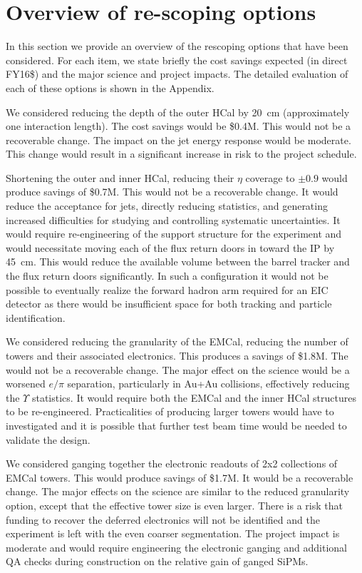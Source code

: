 
\section{Overview of re-scoping options}
\label{sec:overview-re-scoping}

In this section we provide an overview of the rescoping options that
have been considered.  For each item, we state briefly the cost
savings expected (in direct FY16\$) and the major science and project
impacts.  The detailed evaluation of each of these options is shown in
the Appendix.

We considered reducing the depth of the outer HCal by 20~cm
(approximately one interaction length).  The cost savings would be
\$0.4M.  This would not be a recoverable change. The impact on the jet
energy response would be moderate.  This change would result in a
significant increase in risk to the project schedule.

Shortening the outer and inner HCal, reducing their $\eta$ coverage to
$\pm0.9$ would produce savings of \$0.7M.  This would not be a
recoverable change.  It would reduce the acceptance for jets, directly
reducing statistics, and generating increased difficulties for
studying and controlling systematic uncertainties.  It would require
re-engineering of the support structure for the experiment and would
necessitate moving each of the flux return doors in toward the IP by
45~cm.  This would reduce the available volume between the barrel tracker 
and the flux return doors significantly. In such a configuration it 
would not be possible to eventually realize the forward hadron arm 
required for an EIC detector as there would be insufficient space for 
both tracking and particle identification.

We considered reducing the granularity of the EMCal, reducing the
number of towers and their associated electronics.  This produces a
savings of \$1.8M.  The would not be a recoverable change.  The major
effect on the science would be a worsened $e/\pi$ separation,
particularly in Au+Au collisions, effectively reducing the $\Upsilon$
statistics.  It would require both the EMCal and the inner HCal
structures to be re-engineered.  Practicalities of producing larger towers
would have to investigated and it is possible that further test beam
time would be needed to validate the design.

We considered ganging together the electronic readouts of 2x2
collections of EMCal towers. This would produce savings of \$1.7M.  It
would be a recoverable change.  The major effects on the science are
similar to the reduced granularity option, except that the effective
tower size is even larger.  There is a risk that funding to recover
the deferred electronics will not be identified and the experiment is
left with the even coarser segmentation.  The project impact is
moderate and would require engineering the electronic ganging and
additional QA checks during construction on the relative gain of
ganged SiPMs. 

